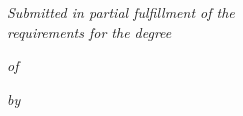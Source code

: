 \begin{titlepage}
    \thispagestyle{empty}
    \begin{center}
        
        \noindent

        \vspace{1.2\baselineskip}
        
        {\LARGE \textit{Submitted in partial fulfillment of the}}\\
        {\LARGE \textit{requirements for the degree}} \par
        
        \vspace{\baselineskip}
        
        {\LARGE \textit{of}} \par
        
        \vspace{\baselineskip}
        
        {\LARGE \bf \mydegree \par} 
        
        \vspace{\baselineskip}
        
        {\LARGE \textit{by}} \par
        
        \vspace{\baselineskip}
        
        
\end{center}
\end{titlepage}
